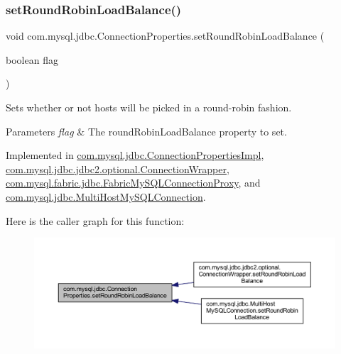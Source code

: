 \subsubsection{\texorpdfstring{set\+Round\+Robin\+Load\+Balance()}{setRoundRobinLoadBalance()}}
{\footnotesize\ttfamily void com.\+mysql.\+jdbc.\+Connection\+Properties.\+set\+Round\+Robin\+Load\+Balance (\begin{DoxyParamCaption}\item[{boolean}]{flag }\end{DoxyParamCaption})}

Sets whether or not hosts will be picked in a round-\/robin fashion.


\begin{DoxyParams}{Parameters}
{\em flag} & The round\+Robin\+Load\+Balance property to set. \\
\hline
\end{DoxyParams}


Implemented in \mbox{\hyperlink{classcom_1_1mysql_1_1jdbc_1_1_connection_properties_impl_ab6219b2405e2a9b5aae85fafacead1da}{com.\+mysql.\+jdbc.\+Connection\+Properties\+Impl}}, \mbox{\hyperlink{classcom_1_1mysql_1_1jdbc_1_1jdbc2_1_1optional_1_1_connection_wrapper_a443c2aa5fdc8084aa721378f69257562}{com.\+mysql.\+jdbc.\+jdbc2.\+optional.\+Connection\+Wrapper}}, \mbox{\hyperlink{classcom_1_1mysql_1_1fabric_1_1jdbc_1_1_fabric_my_s_q_l_connection_proxy_a7adab5e0ed747a21a713ff15dc05d258}{com.\+mysql.\+fabric.\+jdbc.\+Fabric\+My\+S\+Q\+L\+Connection\+Proxy}}, and \mbox{\hyperlink{classcom_1_1mysql_1_1jdbc_1_1_multi_host_my_s_q_l_connection_abda89933ef464c432ec32e019c84d445}{com.\+mysql.\+jdbc.\+Multi\+Host\+My\+S\+Q\+L\+Connection}}.

Here is the caller graph for this function\+:\nopagebreak
\begin{figure}[H]
\begin{center}
\leavevmode
\includegraphics[width=350pt]{interfacecom_1_1mysql_1_1jdbc_1_1_connection_properties_a13ef9e49985c436e69d1a8ed5eb095c6_icgraph}
\end{center}
\end{figure}
\mbox{\label{interfacecom_1_1mysql_1_1jdbc_1_1_connection_properties_abb37aa2ea5dd29021d40a76b33b82939}} 
